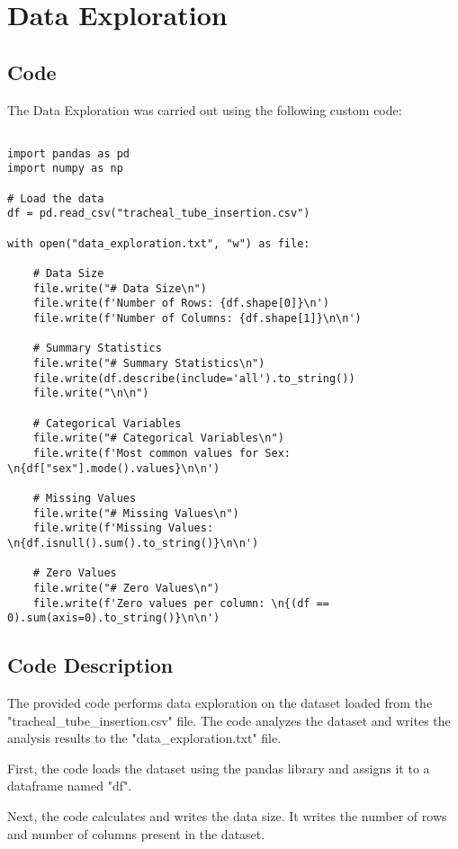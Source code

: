 \documentclass[11pt]{article}
\begin{document}
\section{Data Exploration}
\subsection{{Code}}
The Data Exploration was carried out using the following custom code:

\begin{verbatim}

import pandas as pd
import numpy as np

# Load the data
df = pd.read_csv("tracheal_tube_insertion.csv")

with open("data_exploration.txt", "w") as file:
    
    # Data Size
    file.write("# Data Size\n")
    file.write(f'Number of Rows: {df.shape[0]}\n')
    file.write(f'Number of Columns: {df.shape[1]}\n\n')

    # Summary Statistics
    file.write("# Summary Statistics\n")
    file.write(df.describe(include='all').to_string())
    file.write("\n\n")

    # Categorical Variables
    file.write("# Categorical Variables\n")
    file.write(f'Most common values for Sex: \n{df["sex"].mode().values}\n\n')

    # Missing Values
    file.write("# Missing Values\n")
    file.write(f'Missing Values: \n{df.isnull().sum().to_string()}\n\n')

    # Zero Values
    file.write("# Zero Values\n")
    file.write(f'Zero values per column: \n{(df == 0).sum(axis=0).to_string()}\n\n')

\end{verbatim}

\subsection{Code Description}

The provided code performs data exploration on the dataset loaded from the "tracheal\_tube\_insertion.csv" file. The code analyzes the dataset and writes the analysis results to the "data\_exploration.txt" file.

First, the code loads the dataset using the pandas library and assigns it to a dataframe named "df".

Next, the code calculates and writes the data size. It writes the number of rows and number of columns present in the dataset.
\end{document}
